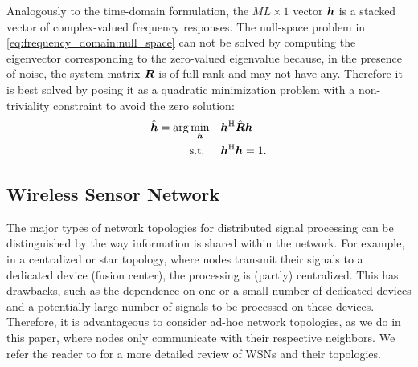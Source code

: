 \documentclass{article}
\begin{document}
Analogously to the time-domain formulation, the \(ML \times 1\) vector \({\bm{h}}\) is a stacked vector of complex-valued frequency responses.
The null-space problem in \eqref{eq:frequency_domain:null_space} can not be solved by computing the eigenvector corresponding to the zero-valued eigenvalue because, in the presence of noise, the system matrix \({\bm{{R}}}\) is of full rank and may not have any.
Therefore it is best solved by posing it as a quadratic minimization problem \cite{guanghanxuLeastsquaresApproachBlind1995,huangAdaptiveMultichannelLeast2002} with a non-triviality constraint to avoid the zero solution:
\begin{equation}
    \begin{aligned}
        \hat{{\bm{h}}} = \arg \min_{{\bm{h}}} \quad &{\bm{h}}^{\mathrm{H}} \hat{{\bm{{R}}}} {\bm{h}} \\
        \text{s.t. } \quad &{\bm{h}}^{\mathrm{H}} {\bm{h}} = 1.
    \end{aligned}\label{eq:frequency_domain:min_prob}
\end{equation}

\subsection{Wireless Sensor Network}
\label{ssec:sensor_network}

The major types of network topologies for distributed signal processing can be distinguished by the way information is shared within the network.
For example, in a centralized or star topology, where nodes transmit their signals to a dedicated device (fusion center), the processing is (partly) centralized.
This has drawbacks, such as the dependence on one or a small number of dedicated devices and a potentially large number of signals to be processed on these devices.
Therefore, it is advantageous to consider ad-hoc network topologies, as we do in this paper, where nodes only communicate with their respective neighbors.
We refer the reader to \cite{bertrandApplicationsTrendsWireless2011b} for a more detailed review of WSNs and their topologies.
\end{document}
